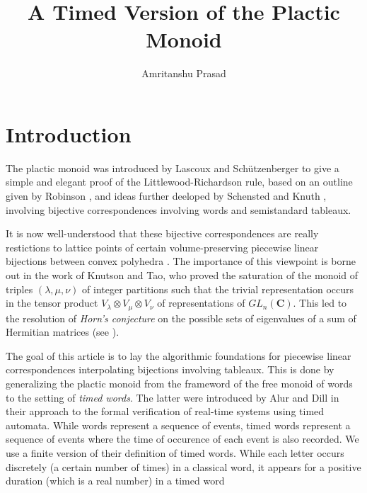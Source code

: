 \documentclass[10pt]{amsproc}
\title{A Timed Version of the Plactic Monoid}
\author{Amritanshu Prasad}
\theoremstyle{definition}
\theoremstyle{remark}
\begin{document}
\maketitle
\begin{abstract}
  
\end{abstract}
\section{Introduction}
The plactic monoid was introduced by Lascoux and Sch\"utzenberger \cite{plaxique} to give a simple and elegant proof of the Littlewood-Richardson rule, based on an outline given by Robinson \cite{robinson-algo}, and ideas further deeloped by Schensted\cite{schensted} and Knuth \cite{knuth}, involving bijective correspondences involving words and semistandard tableaux.

It is now well-understood that these bijective correspondences are really restictions to lattice points of certain volume-preserving piecewise linear bijections between convex polyhedra \cite{kir-trop}.
The importance of this viewpoint is borne out in the work of Knutson and Tao, who proved the saturation of the monoid of triples $(\lambda, \mu, \nu)$ of integer partitions such that the trivial representation occurs in the tensor product $V_\lambda\otimes V_\mu\otimes V_\nu$ of representations of $GL_n(\mathbf C)$.
This led to the resolution of \emph{Horn's conjecture} on the possible sets of eigenvalues of a sum of Hermitian matrices (see \cite{knutsontaojams,knutsontaonotices}).

The goal of this article is to lay the algorithmic foundations for piecewise linear correspondences interpolating bijections involving tableaux.
This is done by generalizing the plactic monoid from the frameword of the free monoid of words to the setting of \emph{timed words}.
The latter were introduced by Alur and Dill \cite{alur-dill} in their approach to the formal verification of real-time systems using timed automata.
While words represent a sequence of events, timed words represent a sequence of events where the time of occurence of each event is also recorded.
We use a finite version of their definition of timed words.
While each letter occurs discretely (a certain number of times) in a classical word, it appears for a positive duration (which is a real number) in a timed word 
\end{document}
